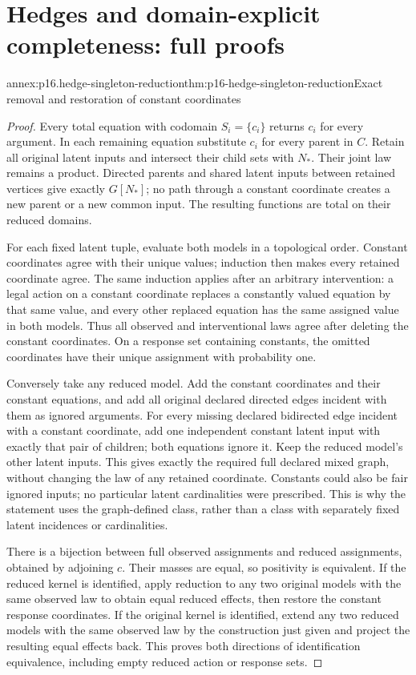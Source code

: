 \section{Hedges and domain-explicit completeness: full proofs}
\label{sec:annex-p16-hedges-and-completeness}

\begin{annexitem}{annex:p16.hedge-singleton-reduction}{thm:p16-hedge-singleton-reduction}{Exact removal and restoration of constant coordinates}
\begin{proof}
Every total equation with codomain \(S_i=\{c_i\}\) returns
\(c_i\) for every argument. In each remaining equation substitute
\(c_i\) for every parent in \(C\). Retain all original latent
inputs and intersect their child sets with \(N_*\). Their joint
law remains a product. Directed parents and shared latent inputs
between retained vertices give exactly \(G[N_*]\); no path
through a constant coordinate creates a new parent or a new common
input. The resulting functions are total on their reduced domains.

For each fixed latent tuple, evaluate both models in a topological
order. Constant coordinates agree with their unique values; induction
then makes every retained coordinate agree. The same induction applies
after an arbitrary intervention: a legal action on a constant coordinate
replaces a constantly valued equation by that same value, and every
other replaced equation has the same assigned value in both models.
Thus all observed and interventional laws agree after deleting the
constant coordinates. On a response set containing constants, the
omitted coordinates have their unique assignment with probability one.

Conversely take any reduced model. Add the constant coordinates and
their constant equations, and add all original declared directed edges
incident with them as ignored arguments. For every missing declared
bidirected edge incident with a constant coordinate, add one independent
constant latent input with exactly that pair of children; both equations
ignore it. Keep the reduced model's other latent inputs. This gives
exactly the required full declared mixed graph, without changing the
law of any retained coordinate. Constants could also be fair ignored
inputs; no particular latent cardinalities were prescribed. This is
why the statement uses the graph-defined class, rather than a class
with separately fixed latent incidences or cardinalities.

There is a bijection between full observed assignments and reduced
assignments, obtained by adjoining \(c\). Their masses are equal,
so positivity is equivalent. If the reduced kernel is identified,
apply reduction to any two original models with the same observed
law to obtain equal reduced effects, then restore the constant response
coordinates. If the original kernel is identified, extend any two
reduced models with the same observed law by the construction just
given and project the resulting equal effects back. This proves both
directions of identification equivalence, including empty reduced
action or response sets.
\end{proof}
\end{annexitem}

